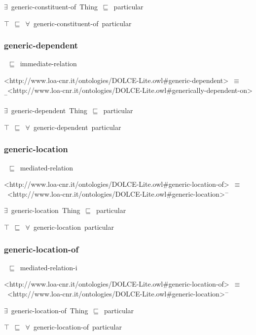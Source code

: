 \documentclass{article}
\begin{document}
\ensuremath{\exists}~generic-constituent-of~Thing~\ensuremath{\sqsubseteq}~particular

\ensuremath{\top}~\ensuremath{\sqsubseteq}~\ensuremath{\forall}~generic-constituent-of~particular

\subsubsection*{generic-dependent}

~\ensuremath{\sqsubseteq}~immediate-relation

<http://www.loa-cnr.it/ontologies/DOLCE-Lite.owl#generic-dependent>~\ensuremath{\equiv}~<http://www.loa-cnr.it/ontologies/DOLCE-Lite.owl#generically-dependent-on>\ensuremath{^-}

\ensuremath{\exists}~generic-dependent~Thing~\ensuremath{\sqsubseteq}~particular

\ensuremath{\top}~\ensuremath{\sqsubseteq}~\ensuremath{\forall}~generic-dependent~particular

\subsubsection*{generic-location}

~\ensuremath{\sqsubseteq}~mediated-relation

<http://www.loa-cnr.it/ontologies/DOLCE-Lite.owl#generic-location-of>~\ensuremath{\equiv}~<http://www.loa-cnr.it/ontologies/DOLCE-Lite.owl#generic-location>\ensuremath{^-}

\ensuremath{\exists}~generic-location~Thing~\ensuremath{\sqsubseteq}~particular

\ensuremath{\top}~\ensuremath{\sqsubseteq}~\ensuremath{\forall}~generic-location~particular

\subsubsection*{generic-location-of}

~\ensuremath{\sqsubseteq}~mediated-relation-i

<http://www.loa-cnr.it/ontologies/DOLCE-Lite.owl#generic-location-of>~\ensuremath{\equiv}~<http://www.loa-cnr.it/ontologies/DOLCE-Lite.owl#generic-location>\ensuremath{^-}

\ensuremath{\exists}~generic-location-of~Thing~\ensuremath{\sqsubseteq}~particular

\ensuremath{\top}~\ensuremath{\sqsubseteq}~\ensuremath{\forall}~generic-location-of~particular
\end{document}

